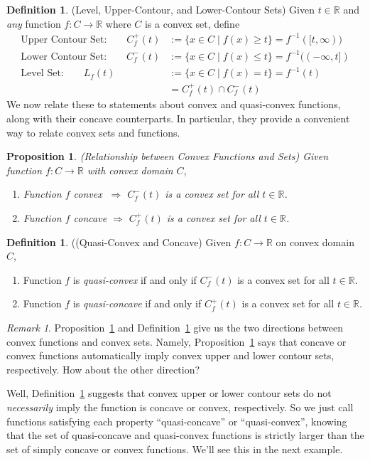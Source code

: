 \documentclass[12pt]{book}
\numberwithin{equation}{section} %
\theoremstyle{plain}
\newtheorem{prop}[thm]{Proposition}
\theoremstyle{definition}
\newtheorem{defn}[thm]{Definition}
\theoremstyle{remark}
\newtheorem*{rmk}{Remark}
\newcommand{\R}{\mathbb{R}}
\begin{document}
\begin{defn}{(Level, Upper-Contour, and Lower-Contour Sets)}
Given $t\in\R$ and \emph{any} function $f:C\rightarrow \R$ where $C$ is
a convex set, define
\begin{align*}
  \text{Upper Contour Set:}
  \qquad C_f^+(t)
  &:= \{ x\in C \; | \; f(x) \geq t\} = f^{-1}([t,\infty)) \\
  \text{Lower Contour Set:}
  \qquad C_f^-(t)
  &:= \{ x\in C \; | \; f(x) \leq t\} = f^{-1}((-\infty,t]) \\
  \text{Level Set:}
  \qquad L_f(t) \;
  &:= \{ x\in C \; | \; f(x) = t\} = f^{-1}(t) \\
  &= C^+_f(t) \cap C^-_f(t)
\end{align*}
We now relate these to statements about convex and quasi-convex
functions, along with their concave counterparts. In particular, they
provide a convenient way to relate convex sets and functions.
\end{defn}

\begin{prop}{\emph{(Relationship between Convex Functions and Sets)}}
\label{prop:convexfcnset}
Given function $f:C\rightarrow \R$ with convex domain $C$,
\begin{enumerate}
  \item Function $f$ convex $\; \Rightarrow$ $C_f^-(t)$ is a convex set
    for all $t\in\R$.
  \item Function $f$ concave $\Rightarrow$ $C_f^+(t)$ is a convex set
    for all $t\in\R$.
\end{enumerate}
\end{prop}

\begin{defn}{((Quasi-Convex and Concave)}
\label{defn:quasiconvex}
Given $f:C\rightarrow \R$ on convex domain $C$,
\begin{enumerate}
  \item Function $f$ is \emph{quasi-convex} if and only if $C^-_f(t)$ is
    a convex set for all $t\in\R$.
  \item Function $f$ is \emph{quasi-concave} if and only if $C^+_f(t)$
    is a convex set for all $t\in\R$.
\end{enumerate}
\end{defn}
\begin{rmk}
Proposition~\ref{prop:convexfcnset} and
Definition~\ref{defn:quasiconvex} give us the two directions between
convex functions and convex sets. Namely,
Proposition~\ref{prop:convexfcnset} says that concave or convex
functions automatically imply convex upper and lower contour sets,
respectively. How about the other direction?

Well, Definition~\ref{defn:quasiconvex} suggests that convex upper or
lower contour sets do not \emph{necessarily} imply the function is
concave or convex, respectively. So we just call functions satisfying
each property ``quasi-concave'' or ``quasi-convex'', knowing that the
set of quasi-concave and quasi-convex functions is strictly larger than
the set of simply concave or convex functions.  We'll see this in the
next example.
\end{rmk}
\end{document}
